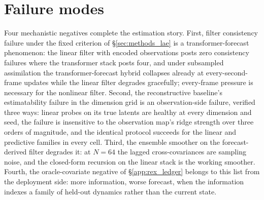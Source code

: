 
\section{Failure modes}
\label{app:failure_modes}

Four mechanistic negatives complete the estimation story. First, filter
consistency failure under the fixed criterion of \S\ref{sec:methods_lae} is a
transformer-forecast phenomenon: the linear filter with encoded
observations posts zero consistency failures where the transformer stack posts
four, and under subsampled assimilation the transformer-forecast hybrid
collapses already at every-second-frame updates while the linear filter
degrades gracefully; every-frame pressure is necessary for the
nonlinear filter. Second, the reconstructive baseline's estimatability
failure in the dimension grid is an observation-side failure, verified
three ways: linear probes on its true latents are healthy at every
dimension and seed, the failure is insensitive to the observation map's
ridge strength over three orders of magnitude, and the identical protocol
succeeds for the linear and predictive families in every cell. Third, the
ensemble smoother on the forecast-derived filter degrades it: at
$N = 64$ the lagged cross-covariances are sampling noise, and the
closed-form recursion on the linear stack is the working smoother.
Fourth, the oracle-covariate negative of \S\ref{app:rex_ledger}
belongs to this list from the deployment side: more information, worse
forecast, when the information indexes a family of held-out dynamics
rather than the current state.
